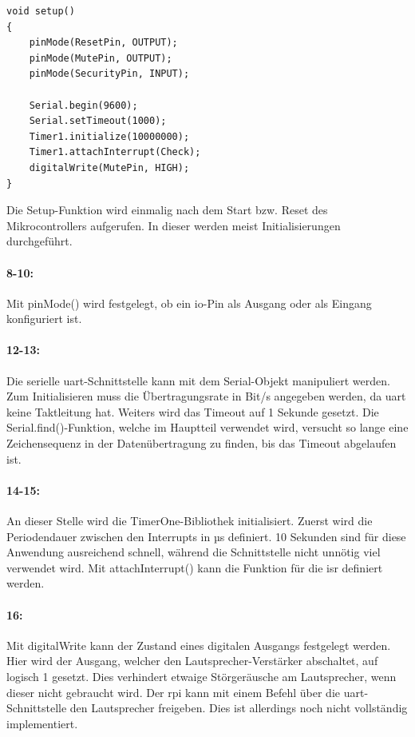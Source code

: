 \begin{verbatim}
void setup()
{
    pinMode(ResetPin, OUTPUT);
    pinMode(MutePin, OUTPUT);
    pinMode(SecurityPin, INPUT);
    
    Serial.begin(9600);
    Serial.setTimeout(1000);
    Timer1.initialize(10000000);
    Timer1.attachInterrupt(Check);
    digitalWrite(MutePin, HIGH);
}
\end{verbatim}
Die Setup-Funktion wird einmalig nach dem Start bzw. Reset des Mikrocontrollers aufgerufen. In dieser werden meist Initialisierungen durchgeführt.

\paragraph{8-10:}
Mit pinMode() wird festgelegt, ob ein \ac{io}-Pin als Ausgang oder als Eingang konfiguriert ist.

\paragraph{12-13:}
Die serielle \ac{uart}-Schnittstelle kann mit dem Serial-Objekt manipuliert werden.
Zum Initialisieren muss die Übertragungsrate in Bit/s angegeben werden, da \ac{uart} keine Taktleitung hat.
Weiters wird das Timeout auf 1 Sekunde gesetzt.
Die Serial.find()-Funktion, welche im Hauptteil verwendet wird, versucht so lange eine Zeichensequenz in der Datenübertragung zu finden, bis das Timeout abgelaufen ist.

\paragraph{14-15:}
An dieser Stelle wird die TimerOne-Bibliothek initialisiert.
Zuerst wird die Periodendauer zwischen den Interrupts in µs definiert.
10 Sekunden sind für diese Anwendung ausreichend schnell, während die Schnittstelle nicht unnötig viel verwendet wird.
Mit attachInterrupt() kann die Funktion für die \ac{isr} definiert werden.

\paragraph{16:}
Mit digitalWrite kann der Zustand eines digitalen Ausgangs festgelegt werden.
Hier wird der Ausgang, welcher den Lautsprecher-Verstärker abschaltet, auf logisch 1 gesetzt.
Dies verhindert etwaige Störgeräusche am Lautsprecher, wenn dieser nicht gebraucht wird.
Der \ac{rpi} kann mit einem Befehl über die \ac{uart}-Schnittstelle den Lautsprecher freigeben.
Dies ist allerdings noch nicht vollständig implementiert.

